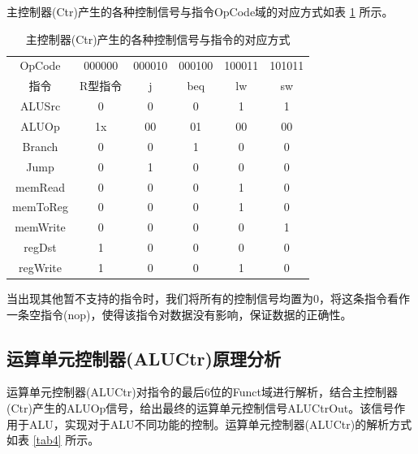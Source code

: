 \documentclass{cumcm}
\numberwithin{equation}{section}
\numberwithin{equation}{subsection}
\begin{document}
主控制器(Ctr)产生的各种控制信号与指令OpCode域的对应方式如表 \ref{tab3} 所示。

\begin{table}[htbp]
    \centering
    \begin{tabular}{|c|c|c|c|c|c|}
        \hline
         OpCode & 000000 & 000010 & 000100 & 100011 & 101011\\ 
         指令 & R型指令 & j & beq & lw & sw \\ \hline
         ALUSrc & 0 & 0 & 0 & 1 & 1\\
         ALUOp & 1x & 00 & 01 & 00 & 00\\
         Branch & 0 & 0 & 1 & 0 & 0\\
         Jump & 0 & 1 & 0 & 0 & 0\\
         memRead & 0 & 0 & 0 & 1 & 0\\
         memToReg & 0 & 0 & 0 & 1 & 0\\
         memWrite & 0 & 0 & 0 & 0 & 1\\
         regDst & 1 & 0 & 0 & 0 & 0\\
         regWrite & 1 & 0 & 0 & 1 & 0\\
         \hline
    \end{tabular}
    \caption{主控制器(Ctr)产生的各种控制信号与指令的对应方式}
    \label{tab3}
\end{table}

当出现其他暂不支持的指令时，我们将所有的控制信号均置为0，将这条指令看作一条空指令(nop)，使得该指令对数据没有影响，保证数据的正确性。

\subsection{运算单元控制器(ALUCtr)原理分析}\label{section2.2}

运算单元控制器(ALUCtr)对指令的最后6位的Funct域进行解析，结合主控制器(Ctr)产生的ALUOp信号，给出最终的运算单元控制信号ALUCtrOut。该信号作用于ALU，实现对于ALU不同功能的控制。运算单元控制器(ALUCtr)的解析方式如表 \ref{tab4} 所示。
\end{document}
